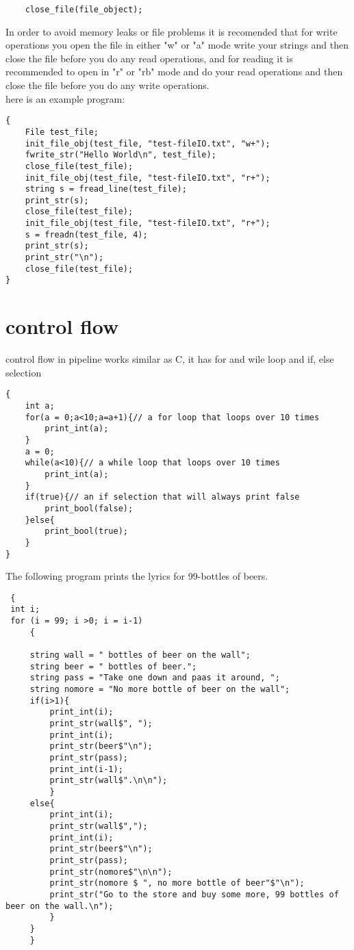 \documentclass[./Report_main.tex]{subfiles}
\begin{document}
\begin{lstlisting}
	close_file(file_object);
\end{lstlisting}
In order to avoid memory leaks or file problems it is recomended that for write operations you open the file in either "w" or "a" mode write your strings and then 
close the file before you do any read operations, and for reading it is recommended to open in "r" or "rb" mode and do your read operations and then close the file before you do any write operations.\\
here is an example program:
\begin{lstlisting}
{
	File test_file;
	init_file_obj(test_file, "test-fileIO.txt", "w+");
	fwrite_str("Hello World\n", test_file);
	close_file(test_file);
	init_file_obj(test_file, "test-fileIO.txt", "r+");
	string s = fread_line(test_file);
	print_str(s);
	close_file(test_file);
	init_file_obj(test_file, "test-fileIO.txt", "r+");
	s = freadn(test_file, 4);
	print_str(s);
	print_str("\n");
	close_file(test_file);
}
\end{lstlisting}
\section{control flow}
control flow in pipeline works similar as C, it has for and wile loop and if, else selection\\
\begin{lstlisting}
{
    int a; 
    for(a = 0;a<10;a=a+1){// a for loop that loops over 10 times
        print_int(a);
    }
    a = 0;
    while(a<10){// a while loop that loops over 10 times
        print_int(a);
    }
    if(true){// an if selection that will always print false
        print_bool(false);
    }else{
        print_bool(true);
    }
}
\end{lstlisting}
The following program prints the lyrics for 99-bottles of beers.\\
\begin{lstlisting}
 {
 int i;
 for (i = 99; i >0; i = i-1)
     {
 
     string wall = " bottles of beer on the wall";
     string beer = " bottles of beer.";
     string pass = "Take one down and paas it around, ";
     string nomore = "No more bottle of beer on the wall";
     if(i>1){
         print_int(i);
         print_str(wall$", ");
         print_int(i);
         print_str(beer$"\n");
         print_str(pass);
         print_int(i-1);
         print_str(wall$".\n\n");
         }
     else{
         print_int(i);
         print_str(wall$",");
         print_int(i);
         print_str(beer$"\n");
         print_str(pass);
         print_str(nomore$"\n\n");
         print_str(nomore $ ", no more bottle of beer"$"\n");
         print_str("Go to the store and buy some more, 99 bottles of beer on the wall.\n");
         }
     }
     }
\end{lstlisting}
\end{document}
